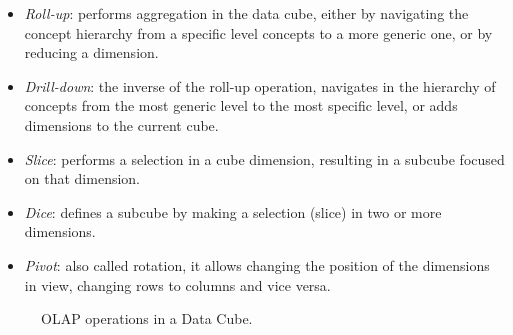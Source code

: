\begin{itemize}[noitemsep]
  \item \textit{Roll-up}: performs aggregation in the data cube, either by navigating the concept hierarchy from a specific level concepts to a more generic one, or by reducing a dimension.
  \item \textit{Drill-down}: the inverse of the roll-up operation, navigates in the hierarchy of concepts from the most generic level to the most specific level, or adds dimensions to the current cube.
  \item \textit{Slice}: performs a selection in a cube dimension, resulting in a subcube focused on that dimension.
  \item \textit{Dice}: defines a subcube by making a selection (slice) in two or more dimensions.
  \item \textit{Pivot}: also called rotation, it allows changing the position of the dimensions in view, changing rows to columns and vice versa.
\end{itemize}

\begin{figure}[!htb]
  \caption{OLAP operations in a Data Cube.}\label{fig:olap}
  \vspace{4mm}
  \begin{center}
  \end{center}
  \vspace{2mm}
\end{figure}

